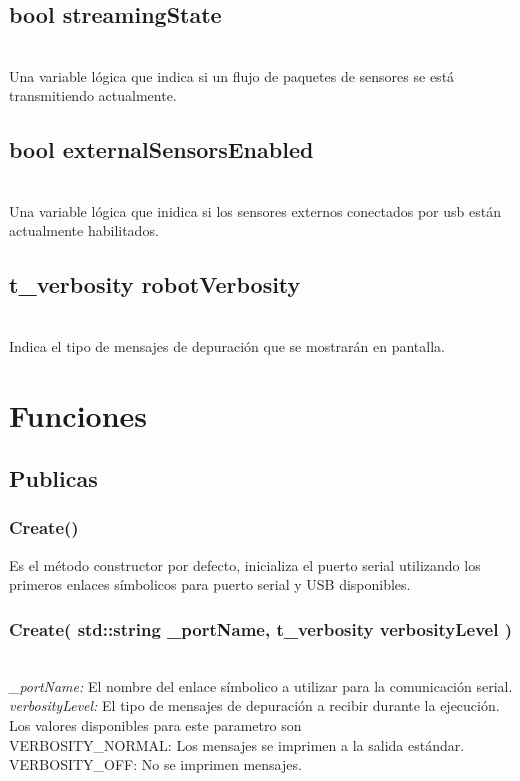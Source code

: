 \documentclass[letterpaper]{book}
\begin{document}
\subsection{bool streamingState}\mbox{}\\
Una variable lógica que indica si un flujo de paquetes de sensores se está transmitiendo actualmente.
\subsection{bool externalSensorsEnabled}\mbox{}\\
Una variable lógica que inidica si los sensores externos conectados por usb están actualmente habilitados.
\subsection{t\_verbosity robotVerbosity}\mbox{}\\
Indica el tipo de mensajes de depuración que se mostrarán en pantalla.


\section{Funciones}
\subsection{Publicas}
\subsubsection{Create()}
Es el método constructor por defecto, inicializa el puerto serial utilizando los primeros enlaces símbolicos para puerto serial y USB disponibles.

\subsubsection{Create( std::string \_portName, t\_verbosity verbosityLevel )}\mbox{}\\
\emph{\_portName: }El nombre del enlace símbolico a utilizar para la comunicación serial.\\
\emph{verbosityLevel: } El tipo de mensajes de depuración a recibir durante la ejecución. Los valores disponibles para este parametro son\\
VERBOSITY\_NORMAL: Los mensajes se imprimen a la salida estándar.\\
VERBOSITY\_OFF: No se imprimen mensajes.\\
\end{document}
